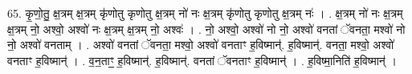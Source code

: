 \documentclass[17pt]{extarticle}
\begin{document}
65. कृ॒णो॒तु॒ क्ष॒त्रम् क्ष॒त्रम् कृ॑णोतु कृणोतु क्ष॒त्रम् नो॑ नः क्ष॒त्रम् कृ॑णोतु कृणोतु क्ष॒त्रम् नः॑ । . क्ष॒त्रम् नो॑ नः क्ष॒त्रम् क्ष॒त्रम् नो॒ अश्वो॒ अश्वो॑ नः क्ष॒त्रम् क्ष॒त्रम् नो॒ अश्वः॑ । . नो॒ अश्वो॒ अश्वो॑ नो नो॒ अश्वो॑ वनतां ॅवनता॒ मश्वो॑ नो नो॒ अश्वो॑ वनताम् । . अश्वो॑ वनतां ॅवनता॒ मश्वो॒ अश्वो॑ वनताꣳ ह॒विष्मान्॑. ह॒विष्मान्॑. वनता॒ मश्वो॒ अश्वो॑ वनताꣳ ह॒विष्मान्॑ । . व॒न॒ताꣳ॒॒ ह॒विष्मान्॑. ह॒विष्मान्॑. वनतां ॅवनताꣳ ह॒विष्मान्॑ । . ह॒विष्मा॒निति॑ ह॒विष्मान्॑ । \newline
\pagebreak
\end{document}
